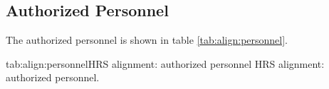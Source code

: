 {\newpage
\begin{safetyen}{10}{15}
\subsection{Authorized  Personnel} 
\end{safetyen}
The authorized personnel is shown in table \ref{tab:align:personnel}.
\begin{namestab}{tab:align:personnel}{HRS alignment: authorized personnel}{%
      HRS alignment: authorized personnel.}
\end{namestab}

} %
